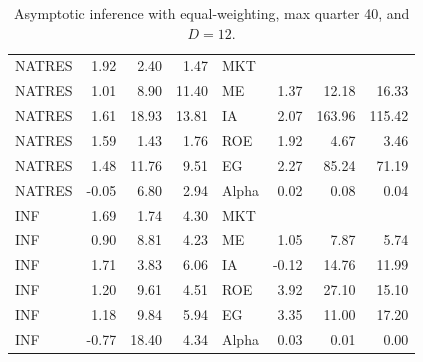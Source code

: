 \documentclass[12pt]{article}
\begin{document}
\begin{table}[ht]
\begin{tabular}{lrrrlrrr}
		NATRES & 1.92 & 2.40 & 1.47 & MKT &  &  &  \\ 
		NATRES & 1.01 & 8.90 & 11.40 & ME & 1.37 & 12.18 & 16.33 \\ 
		NATRES & 1.61 & 18.93 & 13.81 & IA & 2.07 & 163.96 & 115.42 \\ 
		NATRES & 1.59 & 1.43 & 1.76 & ROE & 1.92 & 4.67 & 3.46 \\ 
		NATRES & 1.48 & 11.76 & 9.51 & EG & 2.27 & 85.24 & 71.19 \\ 
		NATRES & -0.05 & 6.80 & 2.94 & Alpha & 0.02 & 0.08 & 0.04 \\ 
		INF & 1.69 & 1.74 & 4.30 & MKT &  &  &  \\ 
		INF & 0.90 & 8.81 & 4.23 & ME & 1.05 & 7.87 & 5.74 \\ 
		INF & 1.71 & 3.83 & 6.06 & IA & -0.12 & 14.76 & 11.99 \\ 
		INF & 1.20 & 9.61 & 4.51 & ROE & 3.92 & 27.10 & 15.10 \\ 
		INF & 1.18 & 9.84 & 5.94 & EG & 3.35 & 11.00 & 17.20 \\ 
		INF & -0.77 & 18.40 & 4.34 & Alpha & 0.03 & 0.01 & 0.00 \\ 
		\hline
	\end{tabular}
	\caption{Asymptotic inference with equal-weighting, max quarter 40, and $D=12$.} 
	\label{tab:ai_40_ew}
\end{table}
\end{document}

